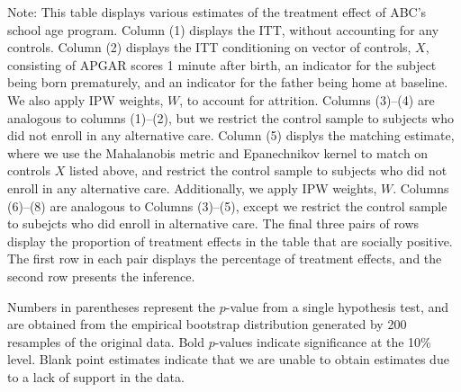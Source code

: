 \begin{table}[H]
\begin{threeparttable}
\begin{tabular}{cccccccccc}
  \hline\hline
  \end{tabular}
    \begin{tablenotes}
    \scriptsize
    \item 
Note: This table displays various estimates of the treatment effect of ABC's school age program.
Column (1) displays the ITT, without accounting for any controls.
Column (2) displays the ITT conditioning on vector of controls, $X$, consisting of APGAR scores 1 
minute after birth, an indicator for the subject being born prematurely, and an indicator for the 
father being home at baseline. We also apply IPW weights, $W$, to account for attrition.
Columns (3)--(4) are analogous to columns (1)--(2), but we restrict the control sample to subjects
who did not enroll in any alternative care.
Column (5) displys the matching estimate, where we use the Mahalanobis metric and Epanechnikov kernel
to match on controls $X$ listed above, and restrict the control sample to subjects who did not enroll
in any alternative care. Additionally, we apply IPW weights, $W$.
Columns (6)--(8) are analogous to Columns (3)--(5), except we restrict the control sample to subejcts
who did enroll in alternative care. 
The final three pairs of rows display the proportion of treatment effects in the table that are 
socially positive. The first row in each pair displays the percentage of treatment effects, and the
second row presents the inference.

Numbers in parentheses represent the $p$-value from a single hypothesis test, and are obtained from 
the empirical bootstrap distribution generated by 200 resamples of the original data. 
Bold $p$-values indicate significance at the 10\% level.
Blank point estimates indicate that we are unable to obtain estimates due to a lack of support in the data. 

    \end{tablenotes}
  \end{threeparttable}

\end{table}
